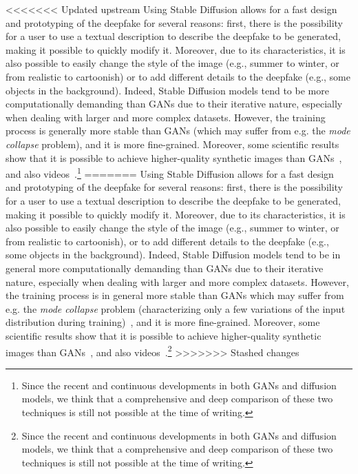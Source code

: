 \documentclass[preprint]{elsarticle}
\begin{document}
<<<<<<< Updated upstream
Using Stable Diffusion allows for a fast design and prototyping of the deepfake for several reasons: first, there is the possibility for a user to use a textual description to describe the deepfake to be generated, making it possible to quickly modify it. Moreover, due to its characteristics, it is also possible to easily change the style of the image (e.g., summer to winter, or from realistic to cartoonish) or to add different details to the deepfake (e.g., some objects in the background). Indeed, Stable Diffusion models tend to be more computationally demanding than GANs due to their iterative nature, especially when dealing with larger and more complex datasets. However, the training process is generally more stable than GANs (which may suffer from e.g. the \emph{mode collapse} problem), and  it is more fine-grained. Moreover, some scientific results show that it is possible to achieve higher-quality synthetic images than GANs~\cite{dmbetter,dmbetter2}, and also videos~\cite{dmbetter3}.\footnote{Since the recent and continuous developments in both GANs and diffusion models, we think that a comprehensive and deep comparison of these two techniques is still not possible at the time of writing.}
=======
Using Stable Diffusion allows for a fast design and prototyping of the deepfake for several reasons: first, there is the possibility for a user to use a textual description to describe the deepfake to be generated, making it possible to quickly modify it. Moreover, due to its characteristics, it is also possible to easily change the style of the image (e.g., summer to winter, or from realistic to cartoonish), or to add different details to the deepfake (e.g., some objects in the background). Indeed, Stable Diffusion models tend to be in general more computationally demanding than GANs due to their iterative nature, especially when dealing with larger and more complex datasets. However, the training process is in general more stable than GANs which may suffer from e.g. the \emph{mode collapse} problem (characterizing only a few variations of the input distribution during training)~\cite{collapse}, and  it is more fine-grained. Moreover, some scientific results show that it is possible to achieve higher-quality synthetic images than GANs~\cite{dmbetter,dmbetter2}, and also videos~\cite{dmbetter3}.\footnote{Since the recent and continuous developments in both GANs and diffusion models, we think that a comprehensive and deep comparison of these two techniques is still not possible at the time of writing.}
>>>>>>> Stashed changes
\end{document}
